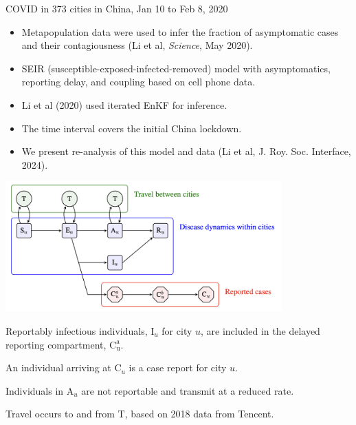 \documentclass{beamer}
\begin{document}
\begin{frame}{COVID in 373 cities in China, Jan 10 to Feb 8, 2020}

  \begin{itemize}
  \item Metapopulation data were used to infer the fraction of asymptomatic cases and their contagiousness
    (Li et al, {\it Science}, May 2020).
  \item SEIR (susceptible-exposed-infected-removed) model with asymptomatics, reporting delay, and coupling based on cell phone data.
  \item Li et al (2020) used iterated EnKF for inference.
  \item The time interval covers the initial China lockdown.
  \item We present re-analysis of this model and data (Li et al, {J. Roy. Soc. Interface}, 2024).

\end{itemize}     

\end{frame}

\begin{frame}
  \begin{center}
      \begin{center}
    \includegraphics[height=5cm]{seair.png}
    \end{center}

\end{center}
\bi
\item 
  Reportably infectious individuals, $\mathrm{I}_u$ for city $u$, are included in the delayed reporting compartment, $\mathrm{C^a_u}$.
  \item 
An individual arriving at $\mathrm{C}_u$ is a case report for city $u$.
\item
  Individuals in $\mathrm{A}_u$ are not reportable and transmit at a reduced rate.
  \item 
Travel occurs to and from $\mathrm{T}$, based on 2018 data from Tencent.
\ei

\end{frame}
\end{document}

